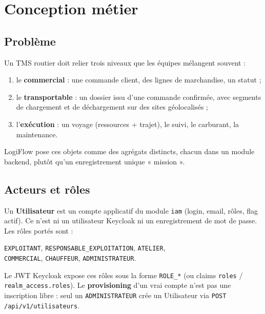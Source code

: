 \chapter{Conception métier}
\label{chap:conception}

\section{Problème}

Un TMS routier doit relier trois niveaux que les équipes mélangent souvent :

\begin{enumerate}[leftmargin=*]
  \item le \textbf{commercial} : une commande client, des lignes de marchandise, un statut ;
  \item le \textbf{transportable} : un dossier issu d'une commande confirmée, avec segments de chargement et de déchargement sur des sites géolocalisés ;
  \item l'\textbf{exécution} : un voyage (ressources + trajet), le suivi, le carburant, la maintenance.
\end{enumerate}

LogiFlow pose ces objets comme des agrégats distincts, chacun dans un module backend, plutôt qu'un enregistrement unique « mission ».


\section{Acteurs et rôles}

Un \textbf{Utilisateur} est un compte applicatif du module \texttt{iam} (login, email, rôles, flag actif). Ce n'est ni un utilisateur Keycloak ni un enregistrement de mot de passe. Les rôles portés sont :

\begin{center}
\texttt{EXPLOITANT}, \texttt{RESPONSABLE\_EXPLOITATION}, \texttt{ATELIER},\\
\texttt{COMMERCIAL}, \texttt{CHAUFFEUR}, \texttt{ADMINISTRATEUR}.
\end{center}

Le JWT Keycloak expose ces rôles sous la forme \texttt{ROLE\_*} (ou claims \texttt{roles} / \texttt{realm\_access.roles}). Le \textbf{provisioning} d'un vrai compte n'est pas une inscription libre : seul un \texttt{ADMINISTRATEUR} crée un Utilisateur via \texttt{POST /api/v1/utilisateurs}.

